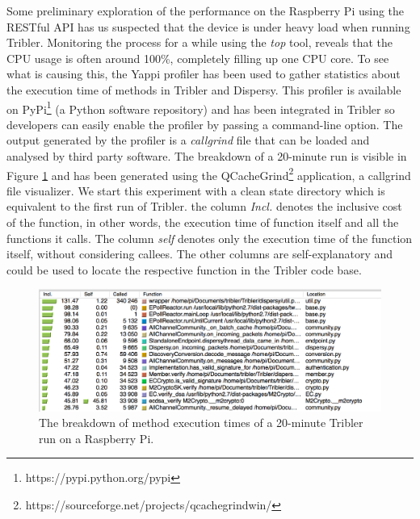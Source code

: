 Some preliminary exploration of the performance on the Raspberry Pi using the RESTful API has us suspected that the device is under heavy load when running Tribler. Monitoring the process for a while using the \emph{top} tool, reveals that the CPU usage is often around 100\%, completely filling up one CPU core. To see what is causing this, the Yappi profiler has been used to gather statistics about the execution time of methods in Tribler and Dispersy. This profiler is available on PyPi\footnote{https://pypi.python.org/pypi} (a Python software repository) and has been integrated in Tribler so developers can easily enable the profiler by passing a command-line option. The output generated by the profiler is a \emph{callgrind} file that can be loaded and analysed by third party software. The breakdown of a 20-minute run is visible in Figure \ref{fig:yappi_breakdown} and has been generated using the  QCacheGrind\footnote{https://sourceforge.net/projects/qcachegrindwin/} application, a callgrind file visualizer. We start this experiment with a clean state directory which is equivalent to the first run of Tribler. the column \emph{Incl.} denotes the inclusive cost of the function, in other words, the execution time of function itself and all the functions it calls. The column \emph{self} denotes only the execution time of the function itself, without considering callees. The other columns are self-explanatory and could be used to locate the respective function in the Tribler code base.\\

\begin{figure}[!h]
	\centering
	\includegraphics[width=1.0\columnwidth]{images/experiments/yappi_breakdown}
	\caption{The breakdown of method execution times of a 20-minute Tribler run on a Raspberry Pi.}
	\label{fig:yappi_breakdown}
\end{figure}


